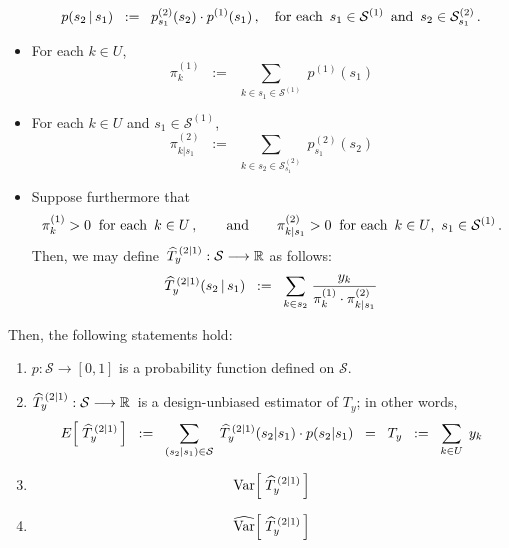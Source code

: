 \begin{theorem}
\begin{itemize}
\begin{equation*}
	p(s_{2}\,\vert\,s_{1}) \;\; := \;\; p^{(2)}_{s_{1}}(s_{2}) \cdot p^{(1)}(s_{1})\,,
	\quad
	\textnormal{for each \,$s_{1} \in \mathcal{S}^{(1)}$\, and \,$s_{2} \in \mathcal{S}^{(2)}_{s_{1}}$}\,.
	\end{equation*}
\item
	For each $k \in U$,
	\begin{equation*}
	\pi^{(1)}_{k} \;\; := \;\; \underset{k \in s_{1} \in \mathcal{S}^{(1)}}{\sum} \; p^{(1)}(s_{1})
	\end{equation*}
\item
	For each $k \in U$ and $s_{1} \in \mathcal{S}^{(1)}$,
	\begin{equation*}
	\pi^{(2)}_{k \vert s_{1}} \;\; := \;\; \underset{k \in s_{2} \in \mathcal{S}^{(2)}_{s_{1}}}{\sum} \; p^{(2)}_{s_{1}}(s_{2})
	\end{equation*}
\item
	Suppose furthermore that
	\begin{equation*}
	\pi^{(1)}_{k} > 0 \;\;\textnormal{for each \,$k \in U$}\,,
	\quad\quad\textnormal{and}\quad\quad
	\pi^{(2)}_{k \vert s_{1}} > 0 \;\;\textnormal{for each \,$k \in U$, \,$s_{1} \in \mathcal{S}^{(1)}$}\,.
	\end{equation*}
	Then, we may define \,$\widehat{T}^{\,(2 \vert 1)}_{y} : \mathcal{S} \longrightarrow \mathbb{R}$ as follows:
	\begin{equation*}
	\widehat{T}^{\,(2 \vert 1)}_{y}(s_{2}\,\vert\,s_{1})
	\;\; := \;\;
		\underset{k \in s_{2}}{\sum}\;\dfrac{y_{k}}{ \pi^{(1)}_{k} \cdot \pi^{(2)}_{k \vert s_{1}} }
	\end{equation*}
\end{itemize}
Then, the following statements hold:
\begin{enumerate}
\item
	$p : \mathcal{S} \longrightarrow [0,1]$ is a probability function defined on $\mathcal{S}$.
\item
	$\widehat{T}^{\,(2 \vert 1)}_{y} : \mathcal{S} \longrightarrow \mathbb{R}$\,
	is a design-unbiased estimator of $T_{y}$; in other words,
	\begin{equation*}
	E\!\left[\;\widehat{T}^{\,(2 \vert 1)}_{y}\,\right]
	\;\; := \;\;
		\underset{(s_{2} \vert s_{1})\in\mathcal{S}}{\sum}\;\,
		\widehat{T}^{\,(2 \vert 1)}_{y}(s_{2} \vert s_{1}) \cdot p(s_{2} \vert s_{1})
	\;\; = \;\;
		T_{y} \;\; := \;\; \underset{k \in U}{\sum}\;\, y_{k}
	\end{equation*}
\item
	\begin{equation*}
	\textnormal{Var}\!\left[\;\widehat{T}^{\,(2 \vert 1)}_{y}\,\right]
	\end{equation*}
\item
	\begin{equation*}
	\widehat{\textnormal{Var}}\!\left[\;\widehat{T}^{\,(2 \vert 1)}_{y}\,\right]
	\end{equation*}
\end{enumerate}
\end{theorem}
